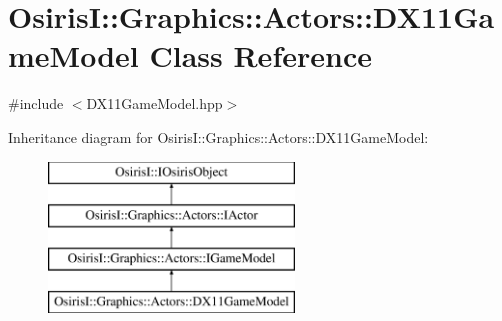 \hypertarget{class_osiris_i_1_1_graphics_1_1_actors_1_1_d_x11_game_model}{\section{Osiris\-I\-:\-:Graphics\-:\-:Actors\-:\-:D\-X11\-Game\-Model Class Reference}
\label{class_osiris_i_1_1_graphics_1_1_actors_1_1_d_x11_game_model}
}


{\ttfamily \#include $<$D\-X11\-Game\-Model.\-hpp$>$}

Inheritance diagram for Osiris\-I\-:\-:Graphics\-:\-:Actors\-:\-:D\-X11\-Game\-Model\-:\begin{figure}[H]
\begin{center}
\leavevmode
\includegraphics[height=4.000000cm]{class_osiris_i_1_1_graphics_1_1_actors_1_1_d_x11_game_model}
\end{center}
\end{figure}
